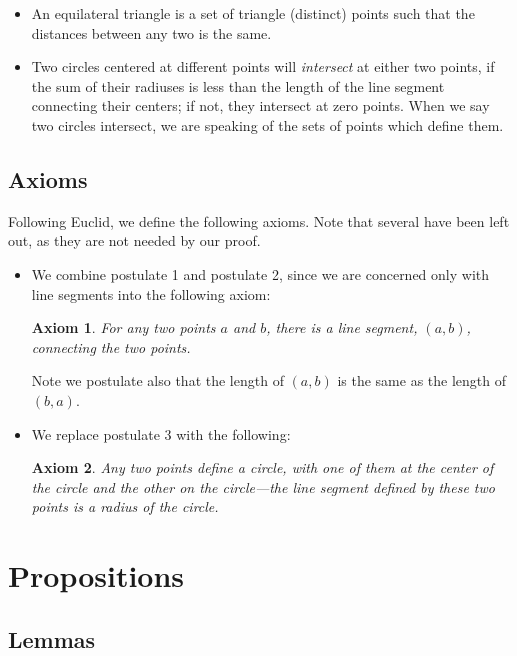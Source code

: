 \documentclass[10pt]{article}
\newtheorem{axiom}{Axiom}
\begin{document}
\begin{itemize}
    \item An equilateral triangle is a set of triangle (distinct) points such that the distances between any two is the same.

    \item Two circles centered at different points will \textit{intersect} at either two points, if the sum of their radiuses is less than the length of the line segment connecting their centers; if not, they intersect at zero points.
        When we say two circles intersect, we are speaking of the sets of points which define them.
\end{itemize}

\subsection{Axioms}

Following Euclid, we define the following axioms.
Note that several have been left out, as they are not needed by our proof.

\begin{itemize}
    \item We combine postulate 1 and postulate 2, since we are concerned only with line segments into the following axiom:
        \begin{axiom}\label{axiom:line}
            For any two points $a$ and $b$, there is a line segment, $(a,b)$, connecting the two points.
        \end{axiom}

        Note we postulate also that the length of $(a,b)$ is the same as the length of $(b,a)$.

    \item We replace postulate 3 with the following:
        \begin{axiom}\label{axiom:circle}
            Any two points define a circle, with one of them at the center of the circle and the other on the circle---the line segment defined by these two points is a radius of the circle.
        \end{axiom}
\end{itemize}

\section{Propositions}

\subsection{Lemmas}
\end{document}
